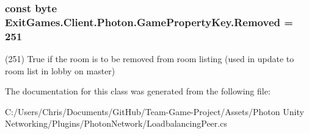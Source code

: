\subsubsection[{\texorpdfstring{Removed}{Removed}}]{\setlength{\rightskip}{0pt plus 5cm}const byte Exit\+Games.\+Client.\+Photon.\+Game\+Property\+Key.\+Removed = 251}\hypertarget{class_exit_games_1_1_client_1_1_photon_1_1_game_property_key_a18ac3b26c2e0f3efbe3bd03afbae74f6}{}\label{class_exit_games_1_1_client_1_1_photon_1_1_game_property_key_a18ac3b26c2e0f3efbe3bd03afbae74f6}


(251) True if the room is to be removed from room listing (used in update to room list in lobby on master)



The documentation for this class was generated from the following file\+:\begin{DoxyCompactItemize}
\item 
C\+:/\+Users/\+Chris/\+Documents/\+Git\+Hub/\+Team-\/\+Game-\/\+Project/\+Assets/\+Photon Unity Networking/\+Plugins/\+Photon\+Network/Loadbalancing\+Peer.\+cs\end{DoxyCompactItemize}
